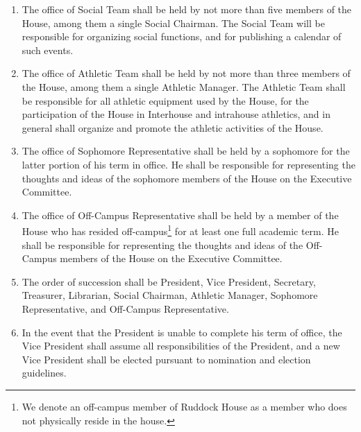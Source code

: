 \documentclass[10pt]{article} %
\begin{document}
\begin{enumerate}
\item The office of Social Team shall be held by not more than five members of the House, among them a single Social Chairman. The Social Team will be responsible for organizing social functions, and for publishing a calendar of such events.
\item The office of Athletic Team shall be held by not more than three members of the House, among them a single Athletic Manager. The Athletic Team shall be responsible for all athletic equipment used by the House, for the participation of the House in Interhouse and intrahouse athletics, and in general shall organize and promote the athletic activities of the House.
\item The office of Sophomore Representative shall be held by a sophomore for the latter portion of his term in office. He shall be responsible for representing the thoughts and ideas of the sophomore members of the House on the Executive Committee.
\item The office of Off-Campus Representative shall be held by a member of the House who has resided off-campus\footnote{We denote an off-campus member of Ruddock House as a member who does not physically reside in the house.} for at least one full academic term. He shall be responsible for representing the thoughts and ideas of the Off-Campus members of the House on the Executive Committee.
\item The order of succession shall be President, Vice President, Secretary, Treasurer, Librarian, Social Chairman, Athletic Manager, Sophomore Representative, and Off-Campus Representative.
\item In the event that the President is unable to complete his term of office, the Vice President shall assume all responsibilities of the President, and a new Vice President shall be elected pursuant to nomination and election guidelines.
\end{enumerate}
\end{document}

